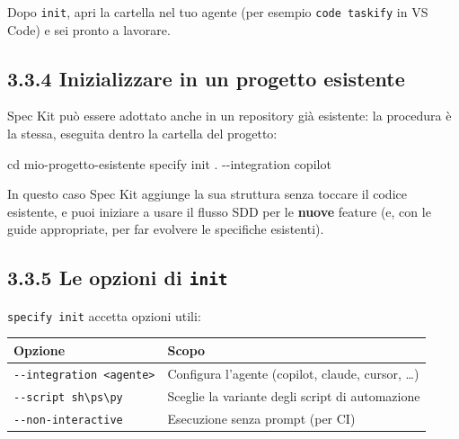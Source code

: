 \documentclass[
  italian,
  10pt,
]{book}
\newenvironment{Shaded}{\begin{snugshade}}{\end{snugshade}}
\newcommand{\AttributeTok}[1]{\textcolor[rgb]{0.13,0.29,0.53}{#1}}
\newcommand{\BuiltInTok}[1]{#1}
\newcommand{\ExtensionTok}[1]{#1}
\newcommand{\NormalTok}[1]{#1}
\newcounter{none} %
\begin{document}
Dopo \texttt{init}, apri la cartella nel tuo agente (per esempio
\texttt{code\ taskify} in VS Code) e sei pronto a lavorare.

\subsection{3.3.4 Inizializzare in un progetto
esistente}\label{inizializzare-in-un-progetto-esistente}

Spec Kit può essere adottato anche in un repository già esistente: la
procedura è la stessa, eseguita dentro la cartella del progetto:

\begin{Shaded}
\begin{Highlighting}[]
\BuiltInTok{cd}\NormalTok{ mio{-}progetto{-}esistente}
\ExtensionTok{specify}\NormalTok{ init . }\AttributeTok{{-}{-}integration}\NormalTok{ copilot}
\end{Highlighting}
\end{Shaded}

In questo caso Spec Kit aggiunge la sua struttura senza toccare il
codice esistente, e puoi iniziare a usare il flusso SDD per le
\textbf{nuove} feature (e, con le guide appropriate, per far evolvere le
specifiche esistenti).

\subsection{\texorpdfstring{3.3.5 Le opzioni di
\texttt{init}}{3.3.5 Le opzioni di init}}\label{le-opzioni-di-init}

\texttt{specify\ init} accetta opzioni utili:

{\def\LTcaptype{none} %
\begin{longtable}[]{@{}
  >{\raggedright\arraybackslash}p{}
  >{\raggedright\arraybackslash}p{}@{}}
\toprule\noalign{}
\begin{minipage}[b]{\linewidth}\raggedright
Opzione
\end{minipage} & \begin{minipage}[b]{\linewidth}\raggedright
Scopo
\end{minipage} \\
\midrule\noalign{}
\endhead
\bottomrule\noalign{}
\endlastfoot
\texttt{-\/-integration\ \textless{}agente\textgreater{}} & Configura
l'agente (copilot, claude, cursor, \ldots) \\
\texttt{-\/-script\ sh\textbackslash{}\textbar{}ps\textbackslash{}\textbar{}py}
& Sceglie la variante degli script di automazione \\
\texttt{-\/-non-interactive} & Esecuzione senza prompt (per CI) \\
\end{longtable}
}
\end{document}
